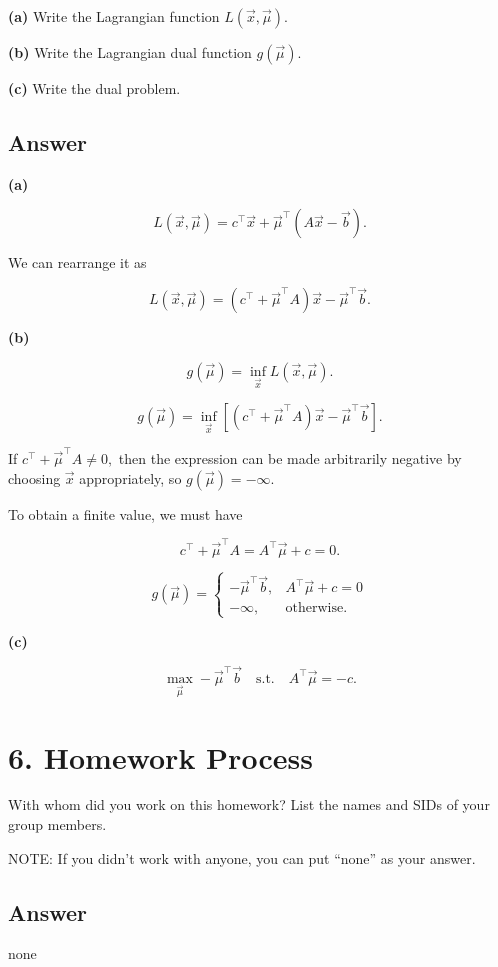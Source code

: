 \documentclass[
  12pt,
]{fphw}
\begin{document}
\textbf{(a)} Write the Lagrangian function $L(\vec{x},\vec{\mu})$.

\textbf{(b)} Write the Lagrangian dual function $g(\vec{\mu})$.

\textbf{(c)} Write the dual problem.

\subsection*{Answer}

\textbf{(a)}

\[
L(\vec{x},\vec{\mu})
=
c^\top \vec{x}
+
\vec{\mu}^\top (A\vec{x}-\vec{b}).
\]

We can rearrange it as

\[
L(\vec{x},\vec{\mu})
=
(c^\top + \vec{\mu}^\top A)\vec{x}
-
\vec{\mu}^\top \vec{b}.
\]


\textbf{(b)}

\[
g(\vec{\mu}) = \inf_{\vec{x}} L(\vec{x},\vec{\mu}).
\]

\[
g(\vec{\mu})
=
\inf_{\vec{x}}
\left[
(c^\top + \vec{\mu}^\top A)\vec{x}
-
\vec{\mu}^\top \vec{b}
\right].
\]

If
$ c^\top + \vec{\mu}^\top A \neq 0, $
then the expression can be made arbitrarily negative by choosing 
$\vec{x}$ appropriately, so
$ g(\vec{\mu}) = -\infty.$

To obtain a finite value, we must have

\[
c^\top + \vec{\mu}^\top A = A^\top \vec{\mu} + c = 0.
\]

\[
g(\vec{\mu}) =
\begin{cases}
-\vec{\mu}^\top \vec{b}, & A^\top \vec{\mu} + c = 0 \\
-\infty, & \text{otherwise}.
\end{cases}
\]

\textbf{(c)}

\[
\max_{\vec{\mu}} -\vec{\mu}^\top \vec{b}
\quad
\text{s.t.}
\quad
A^\top \vec{\mu} = -c.
\]

\newpage
\section*{6. Homework Process}

With whom did you work on this homework? List the names and SIDs of your group members.

NOTE: If you didn’t work with anyone, you can put “none” as your answer.

\subsection*{Answer}
none
\end{document}
